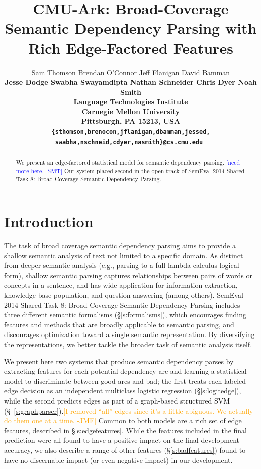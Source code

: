 \documentclass[11pt]{article}
\title{CMU-Ark: Broad-Coverage Semantic Dependency Parsing with Rich
Edge-Factored Features \sam{better title, please}}
\author{
	Sam Thomson \quad
	Brendan O'Connor \quad
	Jeff Flanigan \quad
	David Bamman \quad  \\
	\bf{Jesse Dodge \quad
	Swabha Swayamdipta \quad
	Nathan Schneider \quad
	Chris Dyer \quad
	Noah Smith} \\
  Language Technologies Institute \\
  Carnegie Mellon University \\
  Pittsburgh, PA 15213, USA \\
  {\tt\{sthomson,brenocon,jflanigan,dbamman,jessed,}\\
   \tt{swabha,nschneid,cdyer,nasmith\}@cs.cmu.edu}
}
\date{}
\newcommand{\sam}[1]{\textcolor{blue}{[#1 -SMT]}}
\newcommand{\jmf}[1]{\textcolor{orange}{[#1 -JMF]}}
\begin{document}
\maketitle

\begin{abstract}
We present an edge-factored statistical model for semantic dependency parsing.
\sam{need more here.}
Our system placed second in the open track of SemEval 2014 Shared Task 8:
Broad-Coverage Semantic Dependency Parsing.
\end{abstract}



\section{Introduction}

The task of broad coverage semantic dependency parsing aims to provide a
shallow semantic analysis of text not limited to a specific domain.
As distinct from deeper semantic analysis (e.g., parsing to a full
lambda-calculus logical form), shallow semantic parsing captures relationships
between pairs of words or concepts in a sentence, and has wide application for
information extraction, knowledge base population, and question answering (among others).
SemEval 2014 Shared Task 8: Broad-Coverage Semantic Dependency
Parsing \cite{oepens_broad_2014} includes three different semantic
formalisms (\S\ref{s:formalisms}), which encourages finding features and methods
that are broadly applicable to semantic parsing, and discourages optimization
toward a single semantic representation.
By diversifying the representations, we better tackle the broader task of
semantic analysis itself.

We present here two systems that produce semantic dependency parses by extracting
features for each potential dependency arc and learning a statistical model to
discriminate between good arcs and bad;
the first treats each labeled edge decision as an independent multiclass
logistic regression (\S\ref{s:logitedge}), while the second predicts edges
as part of a graph-based structured SVM (\S~\ref{s:graphparser}).\jmf{I removed ``all'' edges since it's a little abiguous.  We actually do them one at a time.} 
Common to both models are a rich set of edge features, described in
\S\ref{s:edgefeatures}.
While the features included in the final prediction were all found to have a
positive impact on the final development accuracy, we also describe a range of
other features (\S\ref{s:badfeatures}) found to have no discernable impact (or
even negative impact) in our development.
\end{document}
